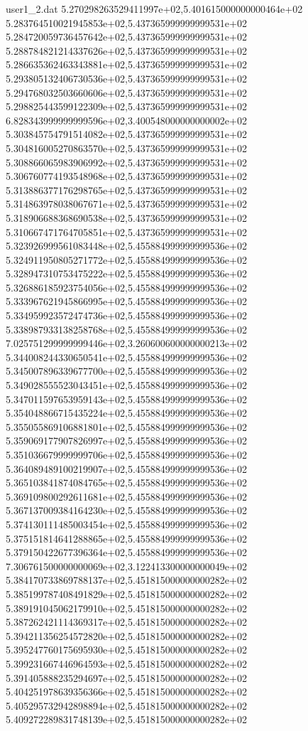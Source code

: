 \begin{filecontents}{user1_2.dat}
5.270298263529411997e+02,5.401615000000000464e+02
5.283764510021945853e+02,5.437365999999999531e+02
5.284720059736457642e+02,5.437365999999999531e+02
5.288784821214337626e+02,5.437365999999999531e+02
5.286635362463343881e+02,5.437365999999999531e+02
5.293805132406730536e+02,5.437365999999999531e+02
5.294768032503660606e+02,5.437365999999999531e+02
5.298825443599122309e+02,5.437365999999999531e+02
6.828343999999999596e+02,3.400548000000000002e+02
5.303845754791514082e+02,5.437365999999999531e+02
5.304816005270863570e+02,5.437365999999999531e+02
5.308866065983906992e+02,5.437365999999999531e+02
5.306760774193548968e+02,5.437365999999999531e+02
5.313886377176298765e+02,5.437365999999999531e+02
5.314863978038067671e+02,5.437365999999999531e+02
5.318906688368690538e+02,5.437365999999999531e+02
5.310667471764705851e+02,5.437365999999999531e+02
5.323926999561083448e+02,5.455884999999999536e+02
5.324911950805271772e+02,5.455884999999999536e+02
5.328947310753475222e+02,5.455884999999999536e+02
5.326886185923754056e+02,5.455884999999999536e+02
5.333967621945866995e+02,5.455884999999999536e+02
5.334959923572474736e+02,5.455884999999999536e+02
5.338987933138258768e+02,5.455884999999999536e+02
7.025751299999999446e+02,3.260600600000000213e+02
5.344008244330650541e+02,5.455884999999999536e+02
5.345007896339677700e+02,5.455884999999999536e+02
5.349028555523043451e+02,5.455884999999999536e+02
5.347011597653959143e+02,5.455884999999999536e+02
5.354048866715435224e+02,5.455884999999999536e+02
5.355055869106881801e+02,5.455884999999999536e+02
5.359069177907826997e+02,5.455884999999999536e+02
5.351036679999999706e+02,5.455884999999999536e+02
5.364089489100219907e+02,5.455884999999999536e+02
5.365103841874084765e+02,5.455884999999999536e+02
5.369109800292611681e+02,5.455884999999999536e+02
5.367137009384164230e+02,5.455884999999999536e+02
5.374130111485003454e+02,5.455884999999999536e+02
5.375151814641288865e+02,5.455884999999999536e+02
5.379150422677396364e+02,5.455884999999999536e+02
7.306761500000000069e+02,3.122413300000000049e+02
5.384170733869788137e+02,5.451815000000000282e+02
5.385199787408491829e+02,5.451815000000000282e+02
5.389191045062179910e+02,5.451815000000000282e+02
5.387262421114369317e+02,5.451815000000000282e+02
5.394211356254572820e+02,5.451815000000000282e+02
5.395247760175695930e+02,5.451815000000000282e+02
5.399231667446964593e+02,5.451815000000000282e+02
5.391405888235294697e+02,5.451815000000000282e+02
5.404251978639356366e+02,5.451815000000000282e+02
5.405295732942898894e+02,5.451815000000000282e+02
5.409272289831748139e+02,5.451815000000000282e+02

\end{filecontents}
